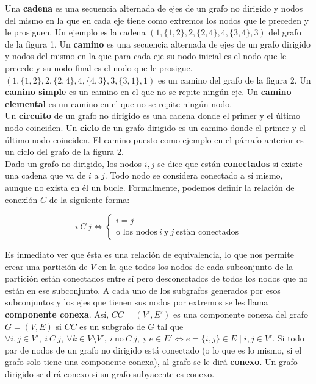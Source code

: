 Una \textbf{cadena} es una secuencia alternada de ejes de un grafo no dirigido y nodos del mismo en la que en cada eje tiene como extremos los nodos que le preceden y le prosiguen.
Un ejemplo es la cadena $(1, \{1,2\},2,\{2,4\},4,\{3,4\},3)$ del grafo de la figura 1.
Un \textbf{camino} es una secuencia alternada de ejes de un grafo dirigido y nodos del mismo en la que para cada eje su nodo inicial es el nodo que le precede y su nodo final es el nodo que le prosigue.
$(1,\{1,2\},2,\{2,4\},4,\{4,3\},3,\{3,1\},1)$ es un camino del grafo de la figura 2.
Un \textbf{camino simple} es un camino en el que no se repite ningún eje.
Un \textbf{camino elemental} es un camino en el que no se repite ningún nodo.\\

Un \textbf{circuito} de un grafo no dirigido es una cadena donde el primer y el último nodo coinciden.
Un \textbf{ciclo} de un grafo dirigido es un camino donde el primer y el último nodo coinciden.
El camino puesto como ejemplo en el párrafo anterior es un ciclo del grafo de la figura 2.\\

Dado un grafo no dirigido, los nodos $i, j$ se dice que están \textbf{conectados} si existe una cadena que va de $i$ a $j$.
Todo nodo se considera conectado a sí mismo, aunque no exista en él un bucle.
Formalmente, podemos definir la relación de conexión $C$ de la siguiente forma:

\begin{equation}
i\ C\ j \iff \left\{ \begin{array}{l}
	i = j \\
	\text{o los nodos}\ i\ \text{y}\ j\ \text{est}\acute{\text{a}}\text{n conectados}
\end{array} \right.
\end{equation}

Es inmediato ver que ésta es una relación de equivalencia, lo que nos permite crear una partición de $V$ en la que todos los nodos de cada subconjunto de la partición están conectados entre sí pero desconectados de todos los nodos que no están en ese subconjunto.
A cada uno de los subgrafos generados por esos subconjuntos y los ejes que tienen sus nodos por extremos se les llama \textbf{componente conexa}.
Así, $CC=(V',E')$ es una componente conexa del grafo $G=(V,E)$ si $CC$ es un subgrafo de $G$ tal que $\forall i, j \in V',\ i\ C\ j,\ \forall k \in V \setminus V',\ i\ \text{no}\ C\ j,\ \text{y}\ e \in E' \iff e=\{i,j\} \in E \mid i,j \in V'$.
Si todo par de nodos de un grafo no dirigido está conectado (o lo que es lo mismo, si el grafo solo tiene una componente conexa), al grafo se le dirá \textbf{conexo}.
Un grafo dirigido se dirá conexo si su grafo subyacente es conexo.

